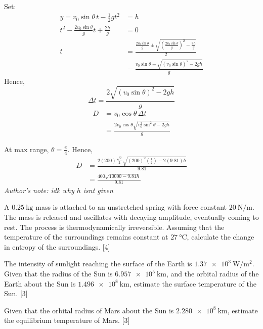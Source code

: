 \begin{solution}
    \begin{subsolution}
        Set:
        \begin{align*}
            y=v_0\sin \theta\,t-\frac{1}{2}gt^2&=h\\
            t^2-\frac{2v_0\sin \theta}{g}t+\frac{2h}{g}&=0\\
            t&=\frac{\frac{2v_0\sin \theta}{g}\pm\sqrt{\left(\frac{2v_0\sin \theta}{g}\right)^2-\frac{8h}{g}}}{2}\\
            &=\frac{v_0\sin \theta\pm\sqrt{\left(v_0\sin \theta\right)^2-2gh}}{g}
        \end{align*}
        Hence,
        \[\Delta t=\frac{2\sqrt{\left(v_0\sin \theta\right)^2-2gh}}{g}\]
        \begin{align*}
            D&=v_0\cos\theta\,\Delta t\\
            &=\boxed{\frac{2v_0\cos \theta\sqrt{v_0^2\sin^2\theta-2gh}}{g}}
        \end{align*}
    \end{subsolution}
    
    \begin{subsolution}
        At max range, \(\theta=\frac{\pi}{4}\). Hence,
        \begin{align*}
            D&=\frac{2(200)\frac{\sqrt{2}}{2}\sqrt{(200)^2(\frac{1}{2})-2(9.81)h}}{9.81}\\
            &=\boxed{\frac{400\sqrt{10000-9.81h}}{9.81}}
        \end{align*}
        \textit{Author's note: idk why $h$ isnt given}
    \end{subsolution}
\end{solution}

\begin{problem}
    \begin{subproblem}
        A $\qty{0.25}{\kg}$ mass is attached to an unstretched spring with force constant $\qty{20}{\N\per\m}$. The mass is released and oscillates with decaying amplitude, eventually coming to rest. The process is thermodynamically irreversible. Assuming that the temperature of the surroundings remains constant at $\qty{27}{\degreeCelsius}$, calculate the change in entropy of the surroundings.
    \hfill{[4]}\end{subproblem}
    \begin{subproblem}
        The intensity of sunlight reaching the surface of the Earth is $\qty{1.37e3}{\W\per\square\m}$. Given that the radius of the Sun is $\qty{6.957e5}{\km}$, and the orbital radius of the Earth about the Sun is $\qty{1.496e8}{\km}$, estimate the surface temperature of the Sun.
    \hfill{[3]}\end{subproblem}
    \begin{subproblem}
        Given that the orbital radius of Mars about the Sun is $\qty{2.280e8}{\km}$, estimate the equilibrium temperature of Mars. 
    \hfill{[3]}\end{subproblem}
\end{problem}

